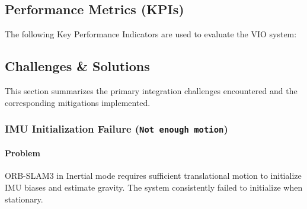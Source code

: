 \subsection{Performance Metrics (KPIs)}
The following Key Performance Indicators are used to evaluate the VIO system:


\begin{table}[H]
\centering
\scriptsize %
\caption{Performance Metrics (KPIs)}
\label{tab:performance_metrics_kpis}

\end{table}



\subsection{Challenges \& Solutions}
This section summarizes the primary integration challenges encountered and the corresponding mitigations implemented.

\subsubsection{IMU Initialization Failure (\texttt{Not enough motion})}
\paragraph{Problem}
ORB-SLAM3 in Inertial mode requires sufficient translational motion to initialize IMU biases and estimate gravity. The system consistently failed to initialize when stationary.
